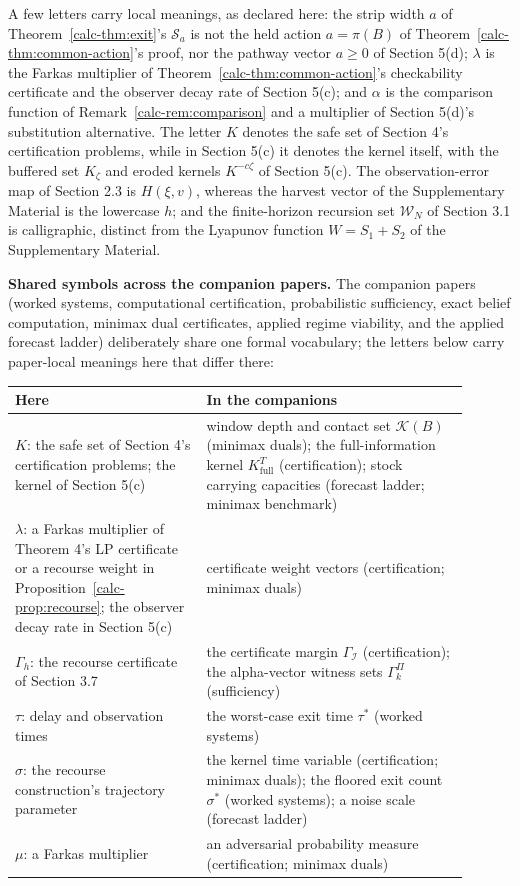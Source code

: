 \documentclass[10pt,twocolumn]{article}
\theoremstyle{definition}
\begin{document}
A few letters carry local meanings, as declared here: the strip width \(a\) of
Theorem~\ref{calc-thm:exit}'s \(\mathcal{S}_a\) is not the held action
\(a = \pi(B)\) of Theorem~\ref{calc-thm:common-action}'s proof, nor the
pathway vector \(a \ge 0\) of Section 5(d); \(\lambda\) is the Farkas
multiplier of Theorem~\ref{calc-thm:common-action}'s checkability
certificate and the observer decay rate of Section 5(c); and
\(\alpha\) is the comparison function of Remark~\ref{calc-rem:comparison}
and a multiplier of Section 5(d)'s substitution alternative. The
letter \(K\) denotes the safe set of Section 4's certification
problems, while in Section 5(c) it denotes the kernel
itself, with the buffered set \(K_\zeta\) and eroded kernels
\(K^{-c\zeta}\) of Section 5(c). The observation-error map of
Section 2.3 is \(H(\xi, v)\), whereas the harvest vector of
the Supplementary Material is the lowercase \(h\); and the finite-horizon recursion
set \(\mathcal{W}_N\) of Section 3.1 is calligraphic, distinct from
the Lyapunov function \(W = S_1 + S_2\) of the Supplementary Material.

\medskip
\noindent\textbf{Shared symbols across the companion papers.} The
companion papers (worked systems, computational certification,
probabilistic sufficiency, exact belief computation, minimax dual
certificates, applied regime viability, and the applied forecast ladder)
deliberately share one formal vocabulary; the letters below carry
paper-local meanings here that differ there:
\begin{center}\small
\begin{tabular}{@{}p{0.38\linewidth}p{0.52\linewidth}@{}}
\toprule
\textbf{Here} & \textbf{In the companions} \\
\midrule
\(K\): the safe set of Section 4's certification problems; the kernel of Section 5(c) & window depth and contact set \(\mathcal{K}(B)\) (minimax duals); the full-information kernel \(K^{T}_{\mathrm{full}}\) (certification); stock carrying capacities (forecast ladder; minimax benchmark) \\
\(\lambda\): a Farkas multiplier of Theorem 4's LP certificate or a recourse weight in Proposition~\ref{calc-prop:recourse}; the observer decay rate in Section 5(c) & certificate weight vectors (certification; minimax duals) \\
\(\Gamma_{h}\): the recourse certificate of Section 3.7 & the certificate margin \(\Gamma_{\mathcal{I}}\) (certification); the alpha-vector witness sets \(\Gamma^{\Pi}_{k}\) (sufficiency) \\
\(\tau\): delay and observation times & the worst-case exit time \(\tau^{*}\) (worked systems) \\
\(\sigma\): the recourse construction's trajectory parameter & the kernel time variable (certification; minimax duals); the floored exit count \(\sigma^{*}\) (worked systems); a noise scale (forecast ladder) \\
\(\mu\): a Farkas multiplier & an adversarial probability measure (certification; minimax duals) \\
\bottomrule
\end{tabular}
\end{center}
\end{document}
